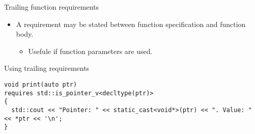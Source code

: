 \begin{frame}[t,fragile]{Trailing function requirements}
\begin{itemize}
  \item A requirement may be stated between function specification and function body.
    \begin{itemize}
      \item Usefule if function parameters are used.
    \end{itemize}
\end{itemize}

\begin{block}{Using trailing requirements}
\begin{lstlisting}
void print(auto ptr)
requires std::is_pointer_v<decltype(ptr)>
{
  std::cout << "Pointer: " << static_cast<void*>(ptr) << ". Value: " << *ptr << '\n';
}
\end{lstlisting}
\end{block}
\end{frame}
